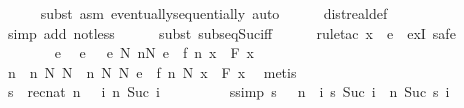 \documentclass[leqno]{article}
\theoremstyle{definition}
\begin{document}
\begin{isabellebody}
\ \ \ \ \isamarkupfalse%
\ {\isacharparenleft}subst\ {\isacharparenleft}asm{\isacharparenright}\ eventually{\isacharunderscore}sequentially{\isacharcomma}\ auto{\isacharparenright}\isanewline
\ \ \ \ \isamarkupfalse%
\ dist{\isacharunderscore}real{\isacharunderscore}def\ \isamarkupfalse%
\ {\isacharparenleft}simp\ add{\isacharcolon}\ not{\isacharunderscore}less{\isacharparenright}\isanewline
\ \ \ \ \isamarkupfalse%
\ {\isacharparenleft}subst\ subseq{\isacharunderscore}Suc{\isacharunderscore}iff{\isacharparenright}\isanewline
\ \ \ \ \isamarkupfalse%
\ {\isacharparenleft}rule{\isacharunderscore}tac\ x\ {\isacharequal}\ e\ \ exI{\isacharcomma}\ safe{\isacharparenright}\isanewline
\ \ \ \ \isamarkupfalse%
\ {\isacharminus}\isanewline
\ \ \ \ \ \ \isamarkupfalse%
\ e\ \isamarkupfalse%
\ e{\isacharcolon}\ {\isachardoublequoteopen}{}\ {\isacharless}\ e{\isachardoublequoteclose}\ {\isachardoublequoteopen}{\isasymforall}N{\isachardot}\ {\isasymexists}n{\isasymge}N{\isachardot}\ e\ {\isasymle}\ {\isasymbar}f\ n\ x\ {\isacharminus}\ F\ x{\isasymbar}{\isachardoublequoteclose}\isanewline
\ \ \ \ \ \ \isamarkupfalse%
\ \isamarkupfalse%
\ n\ \ n{\isacharcolon}\ {\isachardoublequoteopen}{\isasymAnd}N{\isachardot}\ N\ {\isasymle}\ n\ N{\isachardoublequoteclose}\ {\isachardoublequoteopen}{\isasymAnd}N{\isachardot}\ e\ {\isasymle}\ {\isasymbar}f\ {\isacharparenleft}n\ N{\isacharparenright}\ x\ {\isacharminus}\ F\ x{\isasymbar}{\isachardoublequoteclose}\ \isamarkupfalse%
\ metis\isanewline
\ \ \ \ \ \ \isamarkupfalse%
\ s\ {\isasymequiv}\ {\isachardoublequoteopen}rec{\isacharunderscore}nat\ {\isacharparenleft}n\ {}{\isacharparenright}\ {\isacharparenleft}{\isasymlambda}{\isacharunderscore}\ i{\isachardot}\ n\ {\isacharparenleft}Suc\ i{\isacharparenright}{\isacharparenright}{\isachardoublequoteclose}\isanewline
\ \ \ \ \ \ \isamarkupfalse%
\ \isamarkupfalse%
\ s{\isacharbrackleft}simp{\isacharbrackright}{\isacharcolon}\ {\isachardoublequoteopen}s\ {}\ {\isacharequal}\ n\ {}{\isachardoublequoteclose}\ {\isachardoublequoteopen}{\isasymAnd}i{\isachardot}\ s\ {\isacharparenleft}Suc\ i{\isacharparenright}\ {\isacharequal}\ n\ {\isacharparenleft}Suc\ {\isacharparenleft}s\ i{\isacharparenright}{\isacharparenright}{\isachardoublequoteclose}\isanewline
\ \ \ \ \ \ \ \ \isamarkupfalse%

\end{isabellebody}
\end{document}
